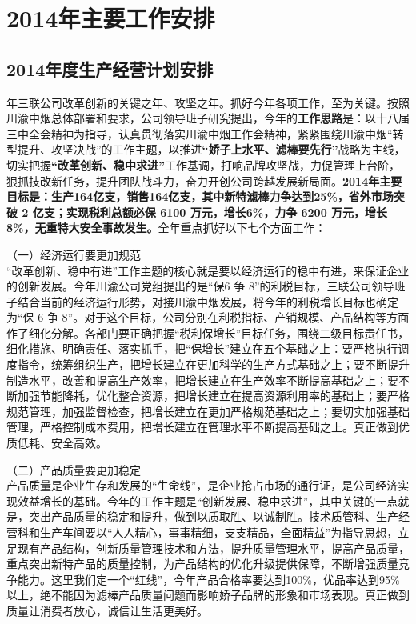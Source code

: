 ﻿\chapter{2014年主要工作安排}
\section{2014年度生产经营计划安排}
 年三联公司改革创新的关键之年、攻坚之年。抓好今年各项工作，至为关键。按照川渝中烟总体部署和要求，公司领导班子研究提出，今年的\textbf{工作思路}是：以十八届三中全会精神为指导，认真贯彻落实川渝中烟工作会精神，紧紧围绕川渝中烟“转型提升、攻坚决战”的工作主题，以推进\textbf{“娇子上水平、滤棒要先行”}战略为主线，切实把握\textbf{“改革创新、稳中求进”}工作基调，打响品牌攻坚战，力促管理上台阶，狠抓技改新任务，提升团队战斗力，奋力开创公司跨越发展新局面。\textbf{2014年主要目标是：生产164亿支，销售164亿支，其中新特滤棒力争达到25\%，省外市场突破 2 亿支；实现税利总额必保 6100 万元，增长6\%，力争 6200 万元，增长8\%，无重特大安全事故发生。}全年重点抓好以下七个方面工作：

（一）经济运行要更加规范\\
\indent “改革创新、稳中有进”工作主题的核心就是要以经济运行的稳中有进，来保证企业的创新发展。今年川渝公司党组提出的是“保6 争 8”的利税目标，三联公司领导班子结合当前的经济运行形势，对接川渝中烟发展，将今年的利税增长目标也确定为“保 6 争 8”。对于这个目标，公司分别在利税指标、产销规模、产品结构等方面作了细化分解。各部门要正确把握“税利保增长”目标任务，围绕二级目标责任书，细化措施、明确责任、落实抓手，把“保增长”建立在五个基础之上：要严格执行调度指令，统筹组织生产，把增长建立在更加科学的生产方式基础之上；要不断提升制造水平，改善和提高生产效率，把增长建立在生产效率不断提高基础之上；要不断加强节能降耗，优化整合资源，把增长建立在提高资源利用率的基础上；要严格规范管理，加强监督检查，把增长建立在更加严格规范基础之上；要切实加强基础管理，严格控制成本费用，把增长建立在管理水平不断提高基础之上。真正做到优质低耗、安全高效。


（二）产品质量要更加稳定\\
\indent
产品质量是企业生存和发展的“生命线”，是企业抢占市场的通行证，是公司经济实现效益增长的基础。今年的工作主题是“创新发展、稳中求进”，其中关键的一点就是，突出产品质量的稳定和提升，做到以质取胜、以诚制胜。技术质管科、生产经营科和生产车间要以“人人精心，事事精细，支支精品，全面精益”为指导思想，立足现有产品结构，创新质量管理技术和方法，提升质量管理水平，提高产品质量，重点突出新特产品的质量控制，为产品结构的优化升级提供保障，不断增强质量竞争能力。这里我们定一个“红线”，今年产品合格率要达到100\%，优品率达到95\% 以上，绝不能因为滤棒产品质量问题而影响娇子品牌的形象和市场表现。真正做到质量让消费者放心，诚信让生活更美好。

